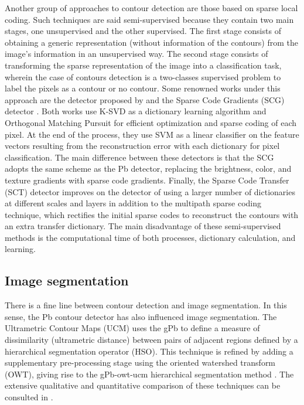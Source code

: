 \documentclass[journal]{IEEEtran}
\begin{document}
Another group of approaches to contour detection are those based on sparse local coding. Such techniques are said semi-supervised because they contain two main stages, one unsupervised and the other supervised. The first stage consists of obtaining a generic representation (without information of the contours) from the image's information in an unsupervised way. The second stage consists of transforming the sparse representation of the image into a classification task, wherein the case of contours detection is a two-classes supervised problem to label the pixels as a contour or no contour. Some renowned works under this approach are the detector proposed by \cite{Mairal.Leordeanu.ea:ECCV:2008} and the Sparse Code Gradients (SCG) detector \cite{Ren.Bo:NIPS:2012}. Both works use K-SVD as a dictionary learning algorithm and Orthogonal Matching Pursuit for efficient optimization and sparse coding of each pixel. At the end of the process, they use SVM as a linear classifier on the feature vectors resulting from the reconstruction error with each dictionary for pixel classification. The main difference between these detectors is that the SCG adopts the same scheme as the Pb detector, replacing the brightness, color, and texture gradients with sparse code gradients. Finally, the Sparse Code Transfer (SCT) detector \cite{Maire.Yu.ea:ACCV:2014} improves on the detector of \cite{Mairal.Leordeanu.ea:ECCV:2008} using a larger number of dictionaries at different scales and layers in addition to the multipath sparse coding technique, which rectifies the initial sparse codes to reconstruct the contours with an extra transfer dictionary. The main disadvantage of these semi-supervised methods is the computational time of both processes, dictionary calculation, and learning. 



\subsection{Image segmentation}
There is a fine line between contour detection and image segmentation. In this sense, the Pb contour detector has also influenced image segmentation. The Ultrametric Contour Maps (UCM) \cite{Arbelaez.Maire.ea:PR:2009} uses the gPb to define a measure of dissimilarity (ultrametric distance) between pairs of adjacent regions defined by a hierarchical segmentation operator (HSO). This technique is refined by adding a supplementary pre-processing stage using the oriented watershed transform (OWT), giving rise to the gPb-owt-ucm hierarchical segmentation method \cite{Arbelaez.Maire.ea:PR:2009}. The extensive qualitative and quantitative comparison of these techniques can be consulted in \cite{Arbelaez.Maire.ea:PAMI:2011}.
\end{document}
